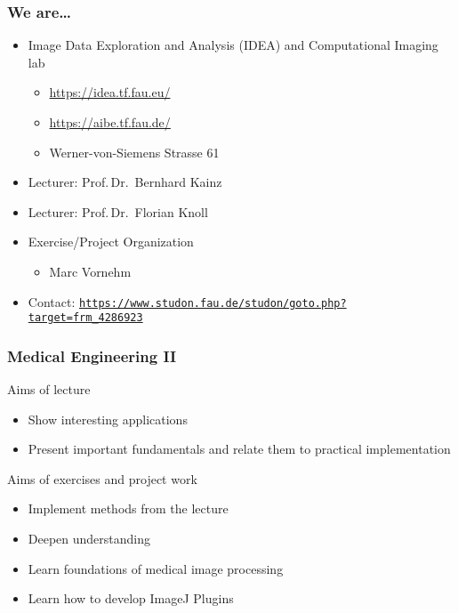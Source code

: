 

\subtitle{Motivation}




\nocite{*}

\frame[plain,c]{\titlepage} %

\begin{frame}
	\frametitle{We are\ldots}
	\begin{itemize}
		\setlength\itemsep{0.5cm}
		\item Image Data Exploration and Analysis (IDEA) and Computational Imaging lab
		      \begin{itemize}
			      \item \url{https://idea.tf.fau.eu/}
			      \item \url{https://aibe.tf.fau.de/}
			      \item Werner-von-Siemens Strasse 61
		      \end{itemize}
		\item Lecturer: Prof.\,Dr.\ Bernhard Kainz
		\item Lecturer: Prof.\,Dr.\ Florian Knoll
		\item Exercise/Project Organization
		      \begin{itemize}
			      \item Marc Vornehm
		      \end{itemize}
		\item Contact: \texttt{\url{https://www.studon.fau.de/studon/goto.php?target=frm_4286923}}
	\end{itemize}
\end{frame}

\begin{frame}
	\frametitle{Medical Engineering II}
	\begin{block}{Aims of lecture}
		\begin{itemize}
			\item Show interesting applications
			\item Present important fundamentals and relate them to practical
			      implementation
		\end{itemize}
	\end{block}
	\begin{block}{Aims of exercises and project work}
		\begin{itemize}
			\item Implement methods from the lecture
			\item Deepen understanding
			\item Learn foundations of medical image processing
			\item Learn how to develop ImageJ Plugins
		\end{itemize}
	\end{block}
\end{frame}

